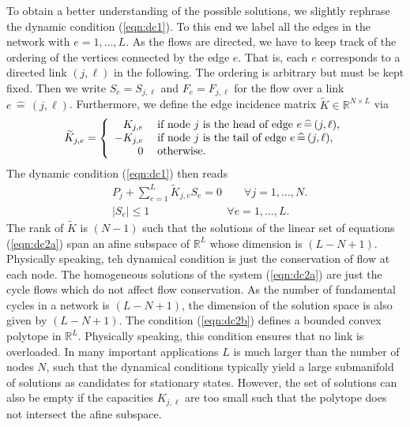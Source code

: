 \documentclass[10pt,aps,pra,twocolumn,superscriptaddress]{revtex4-1}
\newcommand{\be}{\begin{equation}}
\newcommand{\ee}{\end{equation}}
\begin{document}
To obtain a better understanding of the possible solutions,
we slightly rephrase the dynamic condition  (\ref{eqn:dc1}).
To this end we label all the edges in the network with $e = 1,\ldots,L$.
As the flows are directed, we have to keep track of the ordering
of the vertices connected by the edge $e$. That is, each $e$ 
corresponds to a directed link $(j,\ell)$ in the following. The ordering
is arbitrary but must be kept fixed.
Then we write $S_e = S_{j,\ell}$ and $F_e = F_{j,\ell}$
for the flow over a link $e  \,  \widehat= \, (j,\ell)$. 
Furthermore, we define the edge incidence matrix
$\widetilde K \in \mathbb{R}^{N\times L}$ via
\be
   \widetilde K _{j,e} = \left\{
   \begin{array}{r l }
      K_{j,e} & \; \mbox{if node $j$ is the head of edge $e  \,  \widehat= \, (j,\ell)$},  \\
      - K_{j,e} & \; \mbox{if node $j$ is the tail of edge $e  \,  \widehat= \, (j,\ell)$},  \\
      0     & \; \mbox{otherwise}.
  \end{array} \right.
\ee
The dynamic condition (\ref{eqn:dc1}) then reads
\begin{subequations}
\label{eqn:dc2}
\begin{align}
   & P_j + \sum_{e=1}^L \widetilde K _{j,e} S_e = 0 \qquad 
              \forall j=1,\ldots,N. 
     \label{eqn:dc2a}  \\
  &  |S_{e}|   \le 1 \quad \qquad \qquad \qquad  
              \forall e = 1,\ldots,L.
  \label{eqn:dc2b}
\end{align} 
\end{subequations}
The rank of $\widetilde K$ is $(N-1)$ such that the solutions 
of the linear set of equations (\ref{eqn:dc2a}) span an afine 
subspace of $\mathbb{R}^L$ whose dimension  is $(L-N+1)$. 
Physically speaking, teh dynamical condition is just the
conservation of flow at each node. The homogeneous 
solutions of the system (\ref{eqn:dc2a}) are just the cycle
flows which do not affect flow conservation. As the number
of fundamental cycles in a network is  $(L-N+1)$, the dimension
of the solution space is also given by $(L-N+1)$.
The condition (\ref{eqn:dc2b}) defines a bounded convex 
polytope in $\mathbb{R}^L$. Physically speaking, this condition
ensures that no link is overloaded. 
In many important applications $L$ is much larger than 
the number of nodes $N$, such that the dynamical
conditions typically yield a large submanifold of solutions
as candidates for stationary states. However, the set of
solutions can also be empty if the capacities $K_{j,\ell}$
are too small such that the polytope does not intersect
the afine subspace.
  
\end{document}

